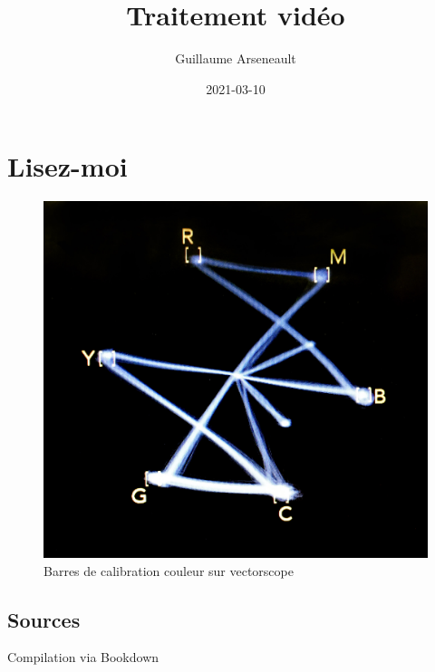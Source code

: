 \documentclass[
  french,
]{book}
\title{Traitement vidéo}
\author{Guillaume Arseneault}
\date{2021-03-10}
\begin{document}
\maketitle

{
\setcounter{tocdepth}{1}
\tableofcontents
}
\hypertarget{lisez-moi}{%
\chapter*{Lisez-moi}\label{lisez-moi}}

\begin{figure}
\centering
\includegraphics{images/vectorscope.jpg}
\caption{\label{fig:unnamed-chunk-1}Barres de calibration couleur sur vectorscope \citep{marsh_ColorBarsVectorscope_2016}}
\end{figure}

\hypertarget{sources}{%
\section*{Sources}\label{sources}}

Compilation via Bookdown \citep{xie_BookdownAuthoringBooks_2020}
\end{document}
